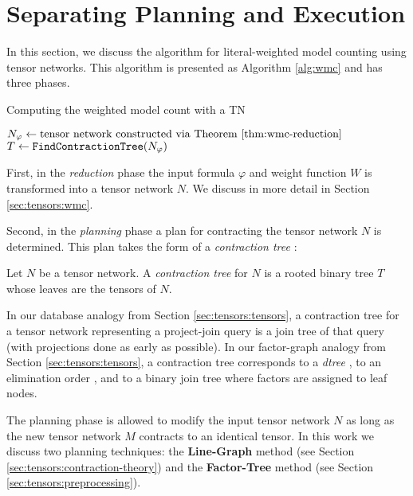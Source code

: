 \section{Separating Planning and Execution}
\label{sec:tensors:algorithm}
In this section, we discuss the algorithm for literal-weighted model counting using tensor networks. This algorithm is presented as Algorithm \ref{alg:wmc} and has three phases.

\begin{algorithm*}[t]
    \label{alg:wmc}
    \caption{Computing the weighted model count with a TN}
    \DontPrintSemicolon
    $N_\varphi \gets \text{tensor network constructed via Theorem \ref{thm:wmc-reduction}}$\;
    $T \gets \texttt{\upshape FindContractionTree}(N_\varphi)$ 
\end{algorithm*}

First, in the \emph{reduction} phase the input formula $\varphi$ and weight function $W$ is transformed into a tensor network $N$. We discuss in more detail in Section \ref{sec:tensors:wmc}.

Second, in the \emph{planning} phase a plan for contracting the tensor network $N$ is determined. This plan takes the form of a \emph{contraction tree} \cite{EP14}:
\begin{definition} \label{def:contraction-tree}
	Let $N$ be a tensor network. A \emph{contraction tree} for $N$ is a rooted binary tree $T$ whose leaves are the tensors of $N$. %
\end{definition}

In our database analogy from Section \ref{sec:tensors:tensors}, a contraction tree for a tensor network representing a project-join query is a join tree of that query (with projections done as early as possible). 
In our factor-graph analogy from Section \ref{sec:tensors:tensors}, a contraction tree corresponds to a \emph{dtree} \cite{darwiche01}, to an elimination order \cite{darwiche01b}, and to a binary join tree \cite{shenoy97} where factors are assigned to leaf nodes.

The planning phase is allowed to modify the input tensor network $N$ as long as the new tensor network $M$ contracts to an identical tensor. In this work we discuss two planning techniques: the \textbf{Line-Graph} method (see Section \ref{sec:tensors:contraction-theory}) and the \textbf{Factor-Tree} method (see Section \ref{sec:tensors:preprocessing}). 

